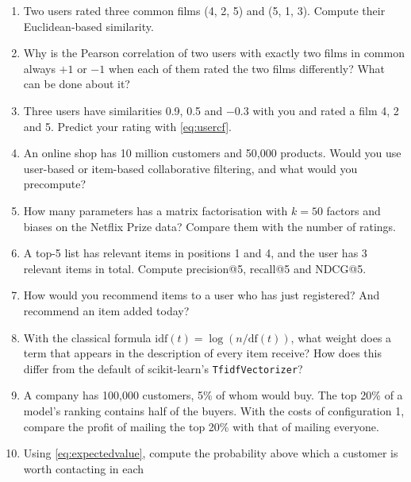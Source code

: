 \begin{enumerate}[label=\textbf{7.\arabic*},ref=7.\arabic*,leftmargin=*,itemsep=6pt]
  \item\label{exr7:euclid} Two users rated three common films (4, 2, 5) and (5, 1, 3). Compute their Euclidean-based similarity.
  \item\label{exr7:pearson} Why is the Pearson correlation of two users with exactly two films in common always $+1$ or $-1$ when each
        of them rated the two films differently? What can be
        done about it?
  \item\label{exr7:predict} Three users have similarities 0.9, 0.5 and $-0.3$ with you and rated a film 4, 2 and 5. Predict your rating with
        \cref{eq:usercf}.
  \item\label{exr7:scale} An online shop has 10 million customers and 50,000 products. Would you use user-based or item-based collaborative
        filtering, and what would you precompute?
  \item\label{exr7:params} How many parameters has a matrix factorisation with $k=50$ factors and biases on the Netflix Prize data? Compare
        them with the number of ratings.
  \item\label{exr7:metrics} A top-5 list has relevant items in positions 1 and 4, and the user has 3 relevant items in total. Compute
        precision@5, recall@5 and NDCG@5.
  \item\label{exr7:cold} How would you recommend items to a user who has just registered? And recommend an item added today?
  \item\label{exr7:tfidf} With the classical formula $\mathrm{idf}(t)=\log(n/\mathrm{df}(t))$, what weight does a term that appears in the
        description of every item receive? How does this differ from the default of scikit-learn's \texttt{TfidfVectorizer}?
  \item\label{exr7:campaign} A company has 100,000 customers, 5\% of whom would buy. The top 20\% of a model's ranking contains half of the
        buyers. With the costs of configuration 1, compare the profit of mailing the top 20\% with that of mailing everyone.
  \item\label{exr7:threshold} Using \cref{eq:expectedvalue}, compute the probability above which a customer is worth contacting in each

\end{enumerate}
